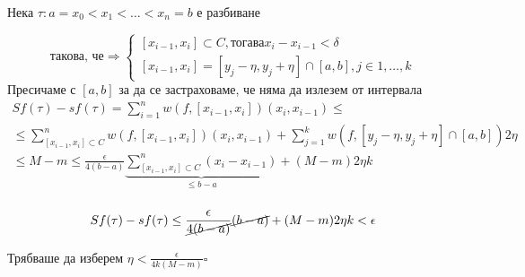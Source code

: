 \documentclass{article}
\begin{document}
\begin{center}
    Нека $\tau: a=x_0<x_1<\dots<x_n=b$ е разбиване
\end{center}
\begin{equation*}
    \text{такова, че} \Rightarrow
    \begin{cases*}
        [x_{i-1},x_i] \subset C, \text{тогава} x_i-x_{i-1}<\delta \\
        [x_{i-1},x_i]=[y_j-\eta,y_j+\eta]\cap[a,b], j\in{1,\dots,k}
    \end{cases*}
\end{equation*}
Пресичаме с $[a,b]$ за да се застраховаме, че няма да излезем от интервала \\

\begin{gather*}
        Sf(\tau)-sf(\tau)=\sum_{i=1}^{n}w(f,[x_{i-1}, x_i])(x_i, x_{i-1}) \le\\
        \le \sum_{[x_{i-1}, x_i] \subset C}^{n}w(f,[x_{i-1}, x_i])(x_i, x_{i-1}) 
        +  \sum_{j=1}^{k}w(f,[y_j-\eta,y_j+\eta]\cap[a,b])2\eta\\
        \le M-m \le \frac{\epsilon}{4(b-a)} \underbrace{\sum_{[x_{i-1}, x_i] \subset C}^{n}(x_i - x_{i-1})}_{\le b-a} + (M-m)2\eta k\\
\end{gather*}

\[Sf(\tau)-sf(\tau) \le \frac{\epsilon}{\cancel{4(b-a)}}\cancel{(b-a)} + (M-m)2\eta k < \epsilon\]

Трябваше да изберем $\eta < \frac{\epsilon}{4k(M-m)} \square$
\end{document}
